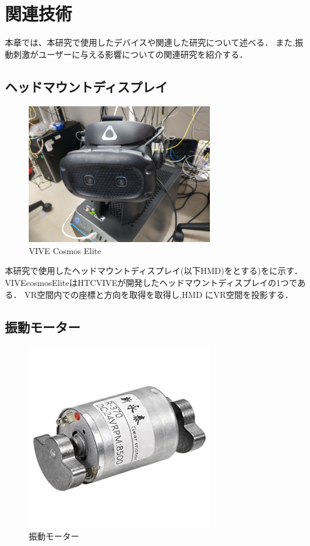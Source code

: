 \chapter{関連技術}

本章では、本研究で使用したデバイスや関連した研究について述べる．
また,振動刺激がユーザーに与える影響についての関連研究を紹介する．

\section{ヘッドマウントディスプレイ}

\begin{figure}[h]
\centering
\includegraphics[clip,width=8cm]{./fig/VIVE.png}
\caption{VIVE Cosmos Elite}\label{vive}
\end{figure}

本研究で使用したヘッドマウントディスプレイ(以下HMD)をとする)をに示す．
VIVEcosmosEliteはHTCVIVEが開発したヘッドマウントディスプレイの1つである．
VR空間内での座標と方向を取得を取得し,HMD にVR空間を投影する．




\newpage

\section{振動モーター}

\begin{figure}[h]
\centering
\includegraphics[clip,width=8cm]{./fig/Motor.jpg}
\caption{振動モーター}\label{motor}
\end{figure}

